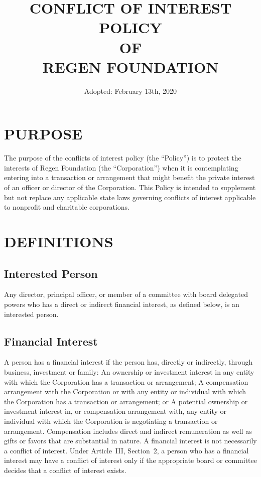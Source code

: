 \documentclass{article}
\begin{document}
\title{CONFLICT OF INTEREST POLICY \protect\\ OF \protect\\ REGEN FOUNDATION}
\author{ Adopted: February 13th, 2020}
\date{} 
\maketitle
\clearpage
\section{PURPOSE}
The purpose of the conflicts of interest policy (the “Policy”) is to protect the interests of Regen Foundation (the “Corporation”) when it is contemplating entering into a transaction or arrangement that might benefit the private interest of an officer or director of the Corporation.  This Policy is intended to supplement but not replace any applicable state laws governing conflicts of interest applicable to nonprofit and charitable corporations.
\section{DEFINITIONS}
\subsection{Interested Person}
Any director, principal officer, or member of a committee with board delegated powers who has a direct or indirect financial interest, as defined below, is an interested person.
\subsection{Financial Interest}
A person has a financial interest if the person has, directly or indirectly, through business, investment or family:
An ownership or investment interest in any entity with which the Corporation has a transaction or arrangement;
A compensation arrangement with the Corporation or with any entity or individual with which the Corporation has a transaction or arrangement; or
A potential ownership or investment interest in, or compensation arrangement with, any entity or individual with which the Corporation is negotiating a transaction or arrangement.
Compensation includes direct and indirect remuneration as well as gifts or favors that are substantial in nature.
A financial interest is not necessarily a conflict of interest.  Under Article III, Section 2, a person who has a financial interest may have a conflict of interest only if the appropriate board or committee decides that a conflict of interest exists.
\end{document}
